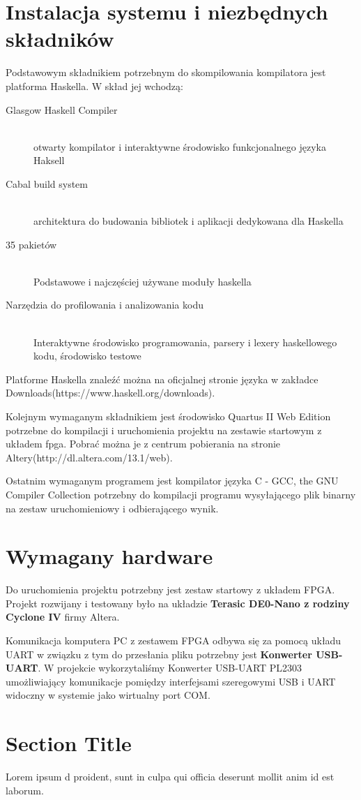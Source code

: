 \section{Instalacja systemu i niezbędnych składników}
Podstawowym składnikiem potrzebnym do skompilowania kompilatora jest platforma Haskella. W skład jej wchodzą:
\begin{description}
  \item[Glasgow Haskell Compiler] \hfill \\
  otwarty kompilator i interaktywne środowisko funkcjonalnego języka Haksell 
  \item[Cabal build system] \hfill \\
  architektura do budowania bibliotek i aplikacji dedykowana dla Haskella
  \item[35 pakietów] \hfill \\
  Podstawowe i najczęściej używane moduły haskella
  \item[Narzędzia do profilowania i analizowania kodu] \hfill \\
  Interaktywne środowisko programowania, parsery i lexery haskellowego kodu, środowisko testowe
\end{description}

Platforme Haskella znaleźć można na oficjalnej stronie języka w zakładce Downloads(https://www.haskell.org/downloads).

Kolejnym wymaganym składnikiem jest środowisko Quartus II Web Edition potrzebne do kompilacji i uruchomienia projektu na zestawie startowym z układem fpga. Pobrać można je z centrum pobierania na stronie Altery(http://dl.altera.com/13.1/web).

Ostatnim wymaganym programem jest kompilator języka C - GCC, the GNU Compiler Collection potrzebny do kompilacji programu wysyłającego plik binarny na zestaw uruchomieniowy i odbierającego wynik.

\section{Wymagany hardware}
Do uruchomienia projektu potrzebny jest zestaw startowy z układem FPGA. Projekt rozwijany i testowany było na układzie \textbf{Terasic DE0-Nano z rodziny Cyclone IV} firmy Altera. 

Komunikacja komputera PC z zestawem FPGA odbywa się za pomocą układu UART w związku z tym do przesłania pliku potrzebny jest \textbf{Konwerter USB-UART}. W projekcie wykorzytaliśmy Konwerter USB-UART PL2303 umożliwiający komunikacje pomiędzy interfejsami szeregowymi USB i UART widoczny w systemie jako wirtualny port COM.


\section{Section Title}
Lorem ipsum d proident, sunt in culpa qui officia deserunt mollit anim id est laborum.

